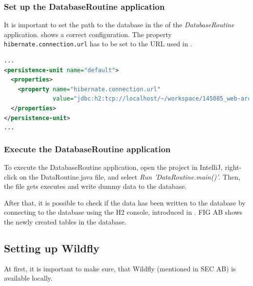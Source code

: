 \subsubsection{Set up the DatabaseRoutine application}\label{sec:03_depl_seeddb_setup}
It is important to set the path to the database in the  of the \textit{DatabaseRoutine} application.  shows a correct configuration. The property \texttt{hibernate.connection.url} has to be set to the URL used in .
\begin{lstlisting}[label=lst:03_depl_seeddb_setup_config, caption=Default data source configuration, language=xml]
...
<persistence-unit name="default">
  <properties>
    <property name="hibernate.connection.url"
              value="jdbc:h2:tcp://localhost/~/workspace/145085_web-architectures/assignment_5/accommodations"/>
  </properties>
</persistence-unit>
...
\end{lstlisting}

\subsubsection{Execute the DatabaseRoutine application}\label{sec:03_depl_seeddb_executeroutine}
To execute the DatabaseRoutine application, open the project in IntelliJ, right-click on the DataRoutine.java file, and select \textit{Run 'DataRoutine.main()'}. Then, the file gets executes and write dummy data to the database.

After that, it is possible to check if the data has been written to the database by connecting to the database using the H2 console, introduced in . FIG AB shows the newly created tables in the database.


\subsection{Setting up Wildfly}\label{sec:03_depl_wildfly}
At first, it is important to make sure, that Wildfly (mentioned in SEC AB) is available locally.

